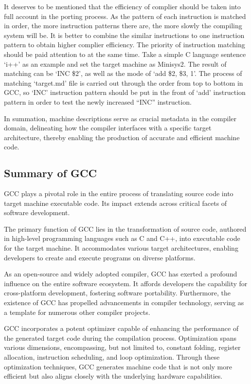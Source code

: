 \documentclass[conference]{IEEEtran}
\begin{document}
It deserves to be mentioned that the efficiency of complier should be taken into full account in the porting process. As the pattern of each instruction is matched in order, the more instruction patterns there are, the more slowly the compiling system will be. It is better to combine the similar instructions to one instruction pattern to obtain higher complier efficiency. The priority of instruction matching should be paid attention to at the same time. Take a simple C language sentence `i++' as an example and set the target machine as Minisys2. The result of matching can be `INC \$2', as well as the mode of `add \$2, \$3, 1'. The process of matching `target.md' file is carried out through the order from top to bottom in GCC, so `INC' instruction pattern should be put in the front of `add' instruction pattern in order to test the newly increased “INC” instruction.\cite{b7}

In summation, machine descriptions serve as crucial metadata in the compiler domain, delineating how the compiler interfaces with a specific target architecture, thereby enabling the production of accurate and efficient machine code.

\subsection{Summary of GCC}

GCC plays a pivotal role in the entire process of translating source code into target machine executable code. Its impact extends across critical facets of software development.

The primary function of GCC lies in the transformation of source code, authored in high-level programming languages such as C and C++, into executable code for the target machine. It accommodates various target architectures, enabling developers to create and execute programs on diverse platforms.

As an open-source and widely adopted compiler, GCC has exerted a profound influence on the entire software ecosystem. It affords developers the capability for cross-platform development, fostering software portability. Furthermore, the existence of GCC has propelled advancements in compiler technology, serving as a template for numerous other compiler projects.

GCC incorporates a potent optimizer capable of enhancing the performance of the generated target code during the compilation process. Optimization spans various dimensions, encompassing, but not limited to, constant folding, register allocation, instruction scheduling, and loop optimization. Through these optimization techniques, GCC generates machine code that is not only more efficient but also aligns closely with the underlying hardware capabilities.
\end{document}
